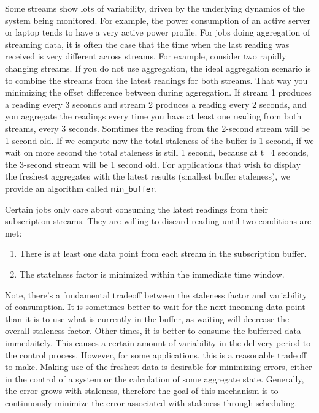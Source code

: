 Some streams show lots of variability, driven by the underlying dynamics of the system being monitored.  For example, the power
consumption of an active server or laptop tends to have a very active power profile.  For jobs doing aggregation of 
streaming data, it is often the case that the time when the last reading was received is very different across streams.  
For example, consider two rapidly changing streams.  If you do not use aggregation, the ideal aggregation scenario is to
combine the streams from the latest readings for both streams.  That way you minimizing the offset difference between during aggregation.
If stream 1 produces a reading every 3 seconds and stream 2 produces a reading every 2 seconds, and you aggregate the readings every time you
have at least one reading from both streams, every 3 seconds.  Somtimes the reading from the 2-second stream will be 1 second old.
If we compute now the total staleness of the buffer is 1 second, if we wait on more second the total staleness is still 1 second, because
at t=4 seconds, the 3-second stream will be 1 second old.
For applications that wish to display the freshest aggregates with the latest results (smallest buffer staleness), we provide an algorithm
called \texttt{min\_buffer}.

Certain jobs only care about consuming the latest readings from their subscription streams.  They are willing to discard reading until two
conditions are met:

\begin{enumerate}
\item There is at least one data point from each stream in the subscription buffer.
\item The statelness factor is minimized within the immediate time window.
\end{enumerate}

Note, there's a fundamental tradeoff
between the staleness factor and variability of consumption.  It is sometimes better to wait for the next incoming data point than it is to use what
is currently in the buffer, as waiting will decrease the overall staleness factor.  Other times, it is better to consume the bufferred data immedaitely.
This causes a certain amount of variability in the delivery period to the control process.  However, for some applications, this is a reasonable tradeoff
to make.  Making use of the freshest data is desirable for minimizing errors, either in the control of a system or the calculation of some aggregate 
state.
Generally, the error grows with staleness, therefore the goal of this mechanism is to continuously minimize the error associated with staleness through
scheduling.


